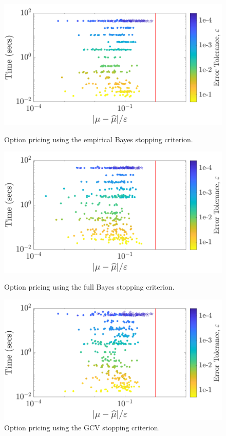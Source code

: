 \documentclass{svjour3}                     %
\begin{document}
\begin{figure}
	\centering
	\includegraphics[width=0.95\linewidth]{"Lattice_optPrice_guaranteed_time_MLE_Baker_d12_r1_2019-Jul-9"}
	\caption[Option pricing Guaranteed: MLE]{Option pricing using the empirical Bayes stopping criterion.}
	\label{fig:optprice-guaranteed-MLE}
	\centering
	\includegraphics[width=0.95\linewidth]{"Lattice_optPrice_guaranteed_time_full_Baker_d12_r1_2019-Jul-9"}
	\caption[OptPrice guaranteed : FB]{Option pricing using the full Bayes stopping criterion.}
	\label{fig:optprice-guaranteed-FB}
	\centering
	\includegraphics[width=0.95\linewidth]{"Lattice_optPrice_guaranteed_time_GCV_Baker_d12_r1_2019-Jul-8"}
	\caption[OptPrice guaranteed : GCV]{Option pricing using the  GCV stopping criterion.}
	\label{fig:optprice-guaranteed-GCV}
\end{figure}
\end{document}
